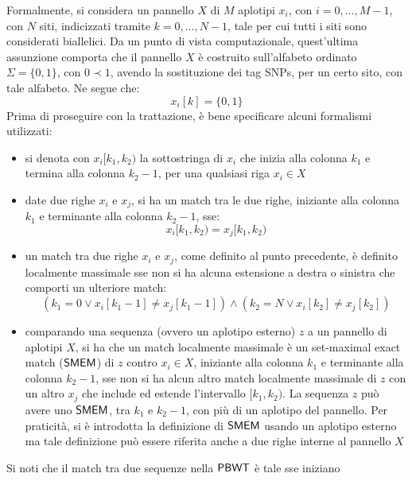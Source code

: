Formalmente, si considera un pannello $X$ di $M$ aplotipi $x_i$, con
$i=0,\ldots, M-1$, con $N$ siti, indicizzati tramite $k=0,\ldots, N-1$, tale per
cui tutti i siti sono considerati biallelici. 
Da un punto di vista computazionale, quest'ultima
assunzione comporta che il pannello $X$ è costruito sull'alfabeto ordinato
$\Sigma =\{0,1\}$, con $0\prec 1$, avendo la sostituzione dei tag SNPs,
per un certo sito, con tale alfabeto. Ne segue che:
\begin{equation}
  \label{eq:pbwtdip}
  x_i[k]=\{0,1\}
\end{equation}
Prima di proseguire con la trattazione, è bene specificare alcuni
formalismi utilizzati:
\begin{itemize}
  \item si denota con $x_i[k_1,k_2)$ la
  sottostringa di $x_i$ che inizia alla colonna $k_1$ e termina alla
  colonna $k_2-1$, per una qualsiasi riga $x_i\in X$
  \item date due righe $x_i$ e $x_j$, si ha un match tra le due
  righe, iniziante
  alla colonna $k_1$ e terminante alla colonna $k_2-1$, sse:
  \begin{equation}
    \label{eq:pbwtmatch}
    x_i[k_1,k_2)=x_j[k_1,k_2)
  \end{equation}
  \item un match tra due righe $x_i$ e $x_j$, come definito al punto precedente,
  è definito localmente massimale sse non si ha alcuna estensione a
  destra o sinistra che comporti un ulteriore match:
  \begin{equation}
    \label{eq:pbwtmem}
    (k_1=0\lor x_i[k_1-1]\neq x_j[k_1-1])\land (k_2=N\lor x_i[k_2]\neq x_j[k_2])
  \end{equation}
  \item comparando una sequenza (ovvero un aplotipo esterno) $z$ a un pannello
  di aplotipi $X$, si ha che un match
  localmente massimale è un
  set-maximal exact match ($\mbox{\rm {\sf SMEM}}$) di $z$ contro $x_i\in X$, iniziante 
  alla colonna $k_1$ e terminante alla colonna $k_2-1$,
  sse non si ha alcun altro match localmente
  massimale di $z$ con un 
  altro $x_j$ che include ed estende l'intervallo $[k_1,k_2)$. La sequenza $z$
  può avere uno $\mbox{\rm {\sf SMEM}}$, tra $k_1$ e $k_2-1$, con più di un aplotipo del
  pannello. Per praticità, si è introdotta la definizione di $\mbox{\rm {\sf SMEM}}$ usando un
  aplotipo esterno ma tale definizione può essere riferita anche a due righe
  interne al pannello $X$
\end{itemize}
Si noti che il match tra due sequenze nella $\mbox{\rm {\sf PBWT}}$ è tale sse iniziano
